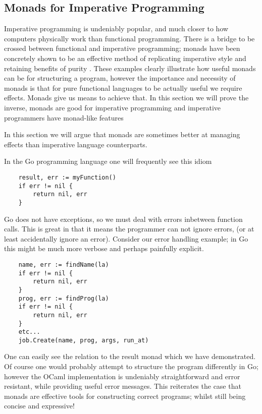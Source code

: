 \subsection{Monads for Imperative Programming}
Imperative programming is undeniably popular,
and much closer to how computers physically work than functional programming.
There is a bridge to be crossed between functional and imperative programming;
monads have been concretely shown to be an effective method of replicating
imperative style and retaining benefits of purity \cite{PeytonJones:1993}.
These examples clearly illustrate how useful monads can be for structuring a program,
however the importance and necessity of monads is that for pure functional languages
to be actually useful we require effects. Monads give us means to achieve that.
In this section we will prove the inverse,
monads are good for imperative programming
and imperative programmers have monad-like features

In this section we will argue that monads are sometimes better
at managing effects than imperative language counterparts.

In the Go programming language one will frequently see this idiom
\begin{verbatim}
    result, err := myFunction()
    if err != nil {
        return nil, err
    }
\end{verbatim}

Go does not have exceptions,
so we must deal with errors inbetween function calls.
This is great in that it means the programmer can not
ignore errors, (or at least accidentally ignore an error).
Consider our error handling example;
in Go this might be much more verbose
and perhaps painfully explicit.

\begin{verbatim}
    name, err := findName(la)
    if err != nil {
        return nil, err
    }
    prog, err := findProg(la)
    if err != nil {
        return nil, err
    }
    etc...
    job.Create(name, prog, args, run_at)
\end{verbatim}

One can easily see the relation to the result monad which we have demonstrated.
Of course one would probably attempt to structure the program differently in Go;
however the OCaml implementation is undeniably straightforward
and error resistant, while providing useful error messages.
This reiterates the case that monads are effective tools
for constructing correct programs;
whilst still being concise and expressive!

